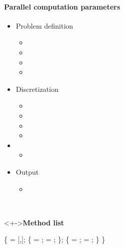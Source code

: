 
\begin{frame}[fragile] 
\secframetitle{\ssParameters}
 \framesubtitle{Parallel computation parameters}
\vspace{-0.2in}
\begin{minipage}[t]{1.80in}
\begin{itemize}
\item Problem definition
  \begin{itemize}
  \item {}
  \item {}
  \item {}
  \item {}
  \end{itemize}
\item Discretization
  \begin{itemize}
  \item {}
  \item {}
  \item {}
  \item {}
  \end{itemize}
\item {}
  \begin{itemize}
  \item {}
  \end{itemize}
\item Output
  \begin{itemize}
    \item {}
  \end{itemize}
\end{itemize}
\end{minipage} \
\begin{minipage}[t]{2.50in}
\vspace{-0.2in}
 \begin{block}<+->{\textbf{Method list}}
 \footnotesize \vspace{-0.1in}
\begin{semiverbatim}
 \{
    = [,];
   \subgroup{ppm} \{
         = ;
        = \valuetext{true};
   \};
    \{
       = ;
        = ;
   \}
\}
\end{semiverbatim}
\end{block}
\end{minipage}
\end{frame}

